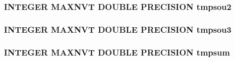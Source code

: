\hypertarget{tdebug_8com_a7e31143aa010697a65a7ffe87ef242e7}{
\subsubsection[{tmpsou2}]{\setlength{\rightskip}{0pt plus 5cm}I\-N\-T\-E\-G\-E\-R M\-A\-X\-N\-V\-T D\-O\-U\-B\-L\-E P\-R\-E\-C\-I\-S\-I\-O\-N tmpsou2}}\label{tdebug_8com_a7e31143aa010697a65a7ffe87ef242e7}
\hypertarget{tdebug_8com_aa8356e45fafae8344ea4ae9ccfe00326}{
\subsubsection[{tmpsou3}]{\setlength{\rightskip}{0pt plus 5cm}I\-N\-T\-E\-G\-E\-R M\-A\-X\-N\-V\-T D\-O\-U\-B\-L\-E P\-R\-E\-C\-I\-S\-I\-O\-N tmpsou3}}\label{tdebug_8com_aa8356e45fafae8344ea4ae9ccfe00326}
\hypertarget{tdebug_8com_af2cc9aa6a0cb8a889362cdb7fc0977ea}{
\subsubsection[{tmpsum}]{\setlength{\rightskip}{0pt plus 5cm}I\-N\-T\-E\-G\-E\-R M\-A\-X\-N\-V\-T D\-O\-U\-B\-L\-E P\-R\-E\-C\-I\-S\-I\-O\-N tmpsum}}\label{tdebug_8com_af2cc9aa6a0cb8a889362cdb7fc0977ea}
